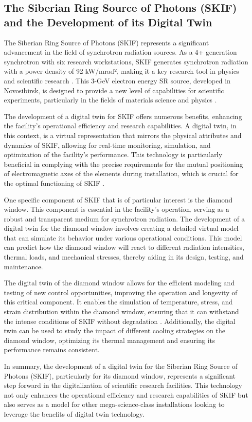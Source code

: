 \subsection{The Siberian Ring Source of Photons (SKIF) and the Development of
its Digital Twin}

The Siberian Ring Source of Photons (SKIF) represents a significant advancement
in the field of synchrotron radiation sources. As a 4+ generation synchrotron
with six research workstations, SKIF generates synchrotron radiation with a
power density of 92 kW/mrad², making it a key research tool in physics and
scientific research \cite{Kabov2021Device, Grishina2020Analysis}. This 3-GeV
electron energy SR source, developed in Novosibirsk, is designed to provide a
new level of capabilities for scientific experiments, particularly in the
fields of materials science and physics \cite{Gurov2020Injection,
Maltseva2022Beam}.

The development of a digital twin for SKIF offers numerous benefits, enhancing
the facility's operational efficiency and research capabilities. A digital
twin, in this context, is a virtual representation that mirrors the physical
attributes and dynamics of SKIF, allowing for real-time monitoring, simulation,
and optimization of the facility's performance. This technology is particularly
beneficial in complying with the precise requirements for the mutual
positioning of electromagnetic axes of the elements during installation, which
is crucial for the optimal functioning of SKIF \cite{Polyansky2022The}.

One specific component of SKIF that is of particular interest is the diamond
window. This component is essential in the facility's operation, serving as a
robust and transparent medium for synchrotron radiation. The development of a
digital twin for the diamond window involves creating a detailed virtual model
that can simulate its behavior under various operational conditions. This model
can predict how the diamond window will react to different radiation
intensities, thermal loads, and mechanical stresses, thereby aiding in its
design, testing, and maintenance.

The digital twin of the diamond window allows for the efficient modeling and
testing of new control opportunities, improving the operation and longevity of
this critical component. It enables the simulation of temperature, stress, and
strain distribution within the diamond window, ensuring that it can withstand
the intense conditions of SKIF without degradation \cite{Kabov2021Device}.
Additionally, the digital twin can be used to study the impact of different
cooling strategies on the diamond window, optimizing its thermal management and
ensuring its performance remains consistent.

In summary, the development of a digital twin for the Siberian Ring Source of
Photons (SKIF), particularly for its diamond window, represents a significant
step forward in the digitalization of scientific research facilities. This
technology not only enhances the operational efficiency and research
capabilities of SKIF but also serves as a model for other mega-science-class
installations looking to leverage the benefits of digital twin technology.
